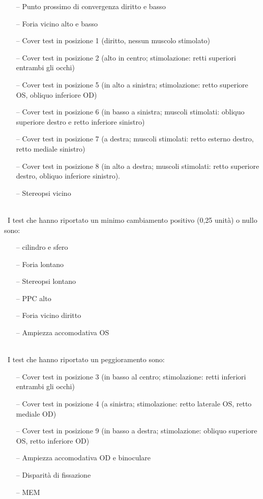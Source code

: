 \begin{itemize}
 \itemsep-0.5em
 \item[--]Punto prossimo di convergenza diritto e basso
 \item[--]Foria vicino alto e basso
 \item[--]Cover test in posizione 1 (diritto, nessun muscolo stimolato)
 \item[--]Cover test in posizione  2 (alto in centro; stimolazione: retti superiori entrambi gli occhi)
 \item[--]Cover test in posizione 5 (in alto a sinistra; stimolazione: retto superiore OS, obliquo inferiore OD)
 \item[--]Cover test in posizione  6 (in basso a sinistra; muscoli stimolati: obliquo superiore destro e retto inferiore sinistro)
 \item[--]Cover test in posizione 7 (a destra; muscoli stimolati: retto esterno destro, retto mediale sinistro)
 \item[--]Cover test in posizione 8 (in alto a destra; muscoli stimolati: retto superiore destro, obliquo inferiore sinistro).
 \item[--]Stereopsi vicino
\end{itemize}
\\\
I test che hanno riportato un minimo cambiamento positivo (0,25 unità) o nullo sono:
\begin{itemize}
 \itemsep-0.5em
 \item[--]cilindro e sfero
 \item[--]Foria lontano
 \item[--]Stereopsi lontano
 \item[--]PPC alto
 \item[--]Foria vicino diritto
 \item[--]Ampiezza accomodativa OS
 \end{itemize}
\\\
I test che hanno riportato un peggioramento sono:
\begin{itemize}
 \itemsep-0.5em
 \item[--]Cover test in posizione 3 (in basso al centro; stimolazione: retti inferiori entrambi gli occhi)
 \item[--]Cover test in posizione 4 (a sinistra; stimolazione: retto laterale OS, retto mediale OD)
 \item[--]Cover test in posizione 9 (in basso a destra; stimolazione: obliquo superiore OS, retto inferiore OD)
 \item[--]Ampiezza accomodativa OD e binoculare
 \item[--]Disparità di fissazione
 \item[--]MEM
 \end{itemize}
 
